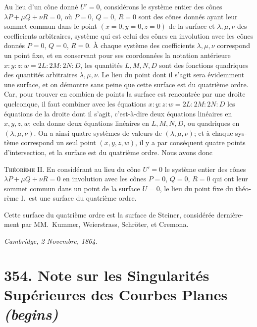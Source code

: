 \documentclass[11pt,a4paper]{article}
\begin{document}
\begin{otherlanguage}{french}
Au lieu d'un c\^one donn\'e $U' = 0$, consid\'erons le syst\`eme entier des c\^ones $\lambda P + \mu Q + \nu R = 0$, o\`u $P = 0$, $Q = 0$, $R = 0$ sont des c\^ones donn\'es ayant leur sommet commun dans le point $(x = 0, y = 0, z = 0)$ de la surface et $\lambda, \mu, \nu$ des coefficients arbitraires, syst\`eme qui est celui des c\^ones en involution avec les c\^ones donn\'es $P = 0$, $Q = 0$, $R = 0$. \`A chaque syst\`eme des coefficients $\lambda, \mu, \nu$ correspond un point fixe, et en conservant pour ses coordonn\'ees la notation ant\'erieure $x : y : z : w = 2L : 2M : 2N : D$, les quantit\'es $L, M, N, D$ sont des fonctions quadriques des quantit\'es arbitraires $\lambda, \mu, \nu$. Le lieu du point dont il s'agit sera \'evidemment une surface, et on d\'emontre sans peine que cette surface est du quatri\`eme ordre. Car, pour trouver en combien de points la surface est rencontr\'ee par une droite quelconque, il faut combiner avec les \'equations $x : y : z : w = 2L : 2M : 2N : D$ les \'equations de la droite dont il s'agit, c'est-\`a-dire deux \'equations lin\'eaires en $x, y, z, w$; cela donne deux \'equations lin\'eaires en $L, M, N, D$, ou quadriques en $(\lambda, \mu, \nu)$. On a ainsi quatre syst\`emes de valeurs de $(\lambda, \mu, \nu)$; et \`a chaque syst\`eme correspond un seul point $(x, y, z, w)$, il y a par cons\'equent quatre points d'intersection, et la surface est du quatri\`eme ordre. Nous avons donc

\medskip
\noindent\textsc{Th\'eor\`eme II.} En consid\'erant au lieu du c\^one $U' = 0$ le syst\`eme entier des c\^ones $\lambda P + \mu Q + \nu R = 0$ en involution avec les c\^ones $P = 0$, $Q = 0$, $R = 0$ qui ont leur sommet commun dans un point de la surface $U = 0$, le lieu du point fixe du th\'eor\`eme I.\ est une surface du quatri\`eme ordre.

\medskip
Cette surface du quatri\`eme ordre est la surface de Steiner, consid\'er\'ee derni\`erement par MM.~Kummer, Weierstrass, Schr\"oter, et Cremona.

\medskip
\noindent\hfill\textit{Cambridge, 2 Novembre, 1864.}\hfill\null

\end{otherlanguage}

\vspace{2em}

\section*{354. Note sur les Singularit\'es Sup\'erieures des Courbes Planes \textit{(begins)}}
\end{document}

